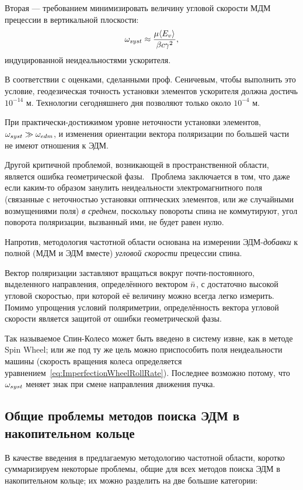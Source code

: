 Вторая --- требованием минимизировать величину угловой скорости МДМ прецессии в 
вертикальной плоскости:~\cite[стр.~11]{BNL:Deuteron2008}
\begin{equation}\label{eq:ImperfectionWheelRollRate}
	\w_{syst} \approx \frac{\mu\avg{E_v}}{\beta c\gamma^2},
\end{equation}
индуцированной неидеальностями ускорителя. 

В соответствии с оценками, сделанными проф. Сеничевым, чтобы выполнить это условие,
геодезическая точность установки элементов ускорителя должна достичь $10^{-14}$ м. 
Технологии сегодняшнего дня позволяют только около $10^{-4}$ м.

При практически-достижимом уровне неточности установки элементов, $\omega_{syst}\gg\omega_{edm}$,
и изменения ориентации вектора поляризации по большей части не имеют отношения к ЭДМ.

Другой критичной проблемой, возникающей в пространственной области, является ошибка
геометрической фазы.~\cite[стр.~6]{BNL:Proton}  Проблема заключается в том, что даже если
каким-то образом занулить неидеальности электромагнитного поля (связанные с неточностью
установки оптических элементов, или же случайными возмущениями поля) \emph{в среднем},
поскольку повороты спина не коммутируют, угол поворота поляризации, вызванный ими, не 
будет равен нулю.

Напротив, методология частотной области основана на измерении ЭДМ-\emph{добавки} к полной
(МДМ и ЭДМ вместе) \emph{угловой скорости} прецессии спина.

Вектор поляризации заставляют вращаться вокруг почти-постоянного, выделенного направления,
определённого вектором $\bar n$, с достаточно высокой угловой скоростью, при которой её
величину можно всегда легко измерить. Помимо упрощения условий поляриметрии, определённость
вектора угловой скорости является защитой от ошибки геометрической фазы.

Так называемое Спин-Колесо может быть введено в систему извне, как в методе Spin Wheel; или же
под ту же цель можно приспособить поля неидеальности машины (скорость вращения колеса 
определяется уравнением~\eqref{eq:ImperfectionWheelRollRate}). Последнее возможно потому,
что $\omega_{syst}$ меняет знак при смене направления движения пучка.~\cite[стр.~11]{BNL:Deuteron2008}

\subsection{Общие проблемы методов поиска ЭДМ в накопительном кольце}
В качестве введения в предлагаемую методологию частотной области, коротко суммаризируем 
некоторые проблемы, общие для всех методов поиска ЭДМ в накопительном кольце; их можно
разделить на две большие категории:

